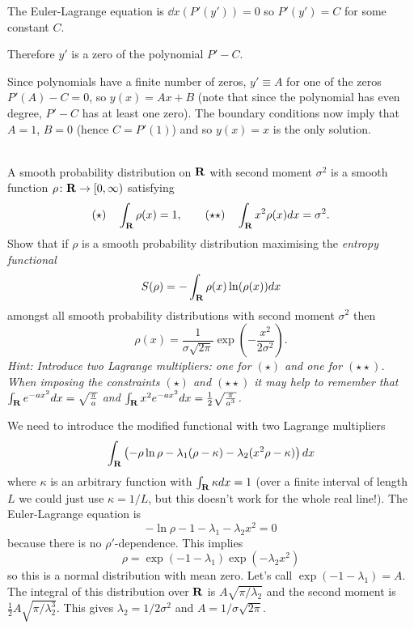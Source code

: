 \documentclass[12pt]{article}
\begin{document}
\begin{answer}
The Euler-Lagrange equation is $\dd{}{x}\left(P'(y')\right)=0$ so $P'(y')=C$ for some constant $C$.


Therefore $y'$ is a zero of the polynomial $P'-C$.


Since polynomials have a finite number of zeros, $y'\equiv A$ for one of the zeros $P'(A)-C=0$, so $y(x)=Ax+B$ (note that since the polynomial has even degree, $P'-C$ has at least one zero). The boundary conditions now imply that $A=1$, $B=0$ (hence $C=P'(1)$) and so $y(x)=x$ is the only solution.

\end{answer}
\newpage

\bigskip

\begin{question}\ \\
A smooth probability distribution on $\mathbf{R}$ with second moment $\sigma^2$ is a smooth function $\rho\colon\mathbf{R}\to[0,\infty)$ satisfying
\[(\star)\quad \int_{\mathbf{R}}\rho(x)=1,\qquad (\star\star)\quad\int_{\mathbf{R}}x^2\rho(x)dx=\sigma^2.\]
Show that if $\rho$ is a smooth probability distribution maximising the {\em entropy functional}
\[S(\rho)=-\int_{\mathbf{R}}\rho(x)\ln(\rho(x))dx\]
amongst all smooth probability distributions with second moment $\sigma^2$ then
\[\rho(x)=\frac{1}{\sigma\sqrt{2\pi}}\exp\left(-\frac{x^2}{2\sigma^2}\right).\]
{\em Hint: Introduce two Lagrange multipliers: one for $(\star)$ and one for $(\star\star)$. When imposing the constraints $(\star)$ and $(\star\star)$ it may help to remember that $\int_{\mathbf{R}}e^{-ax^2}dx=\sqrt{\frac{\pi}{a}}$ and $\int_{\mathbf{R}}x^2e^{-ax^2}dx=\frac{1}{2}\sqrt{\frac{\pi}{a^3}}$.}
\end{question}

\begin{answer}
We need to introduce the modified functional with two Lagrange multipliers
\[\int_{\mathbf{R}}\left(-\rho\ln\rho-\lambda_1(\rho-\kappa)-\lambda_2(x^2\rho-\kappa)\right)dx\]
where $\kappa$ is an arbitrary function with $\int_{\mathbf{R}}\kappa dx=1$ (over a finite interval of length $L$ we could just use $\kappa=1/L$, but this doesn't work for the whole real line!). The Euler-Lagrange equation is
\[-\ln\rho-1-\lambda_1-\lambda_2x^2=0\]
because there is no $\rho'$-dependence. This implies
\[\rho=\exp(-1-\lambda_1)\exp(-\lambda_2x^2)\]
so this is a normal distribution with mean zero. Let's call $\exp(-1-\lambda_1)=A$. The integral of this distribution over $\mathbf{R}$ is $A\sqrt{\pi/\lambda_2}$ and the second moment is $\tfrac{1}{2}A\sqrt{\pi/\lambda_2^3}$. This gives $\lambda_2=1/2\sigma^2$ and $A=1/\sigma\sqrt{2\pi}$.
\end{answer}
\newpage
\end{document}
